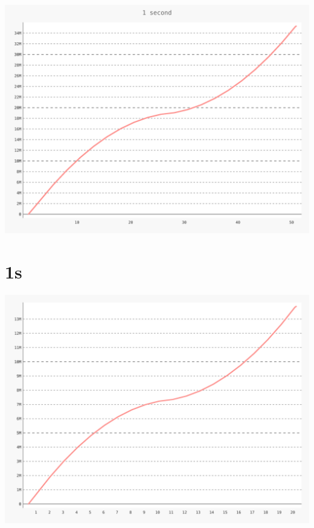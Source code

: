 \documentclass{article}
\begin{document}
    \begin{center}
    \includegraphics{set_a_2.5s/set_a_2_5s.svg}
    \end{center}
\clearpage

\section{1s}
    \noindent\begin{minipage}{.45\textwidth}
    
    \end{minipage}\hfill
    \begin{minipage}{.45\textwidth}
    
    \end{minipage}
    
    \begin{center}
    \includegraphics{set_a_1s/set_a_1s.svg}
    \end{center}
\clearpage
\end{document}
